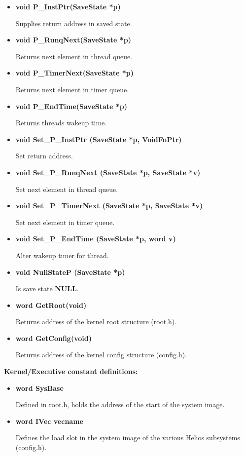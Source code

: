 \begin{itemize}

\item {\bf void P\_InstPtr(SaveState *p)} 

Supplies return address in saved state.

\item {\bf void P\_RunqNext(SaveState *p)} 

Returns next element in thread queue.

\item {\bf void P\_TimerNext(SaveState *p)} 

Returns next element in timer queue.

\item {\bf void P\_EndTime(SaveState *p)} 

Returns threads wakeup time.

\item {\bf void Set\_P\_InstPtr (SaveState *p, VoidFnPtr)} 

Set return address.

\item {\bf void Set\_P\_RunqNext (SaveState *p, SaveState *v)} 

Set next element in thread queue.

\item {\bf void Set\_P\_TimerNext (SaveState *p, SaveState *v)} 

Set next element in timer queue.

\item {\bf void Set\_P\_EndTime (SaveState *p, word v)} 

Alter wakeup timer for thread.

\item {\bf void NullStateP (SaveState *p)} 

Is save state {\bf NULL}.

\item {\bf word GetRoot(void)}

Returns address of the kernel root structure (root.h).

\item {\bf word GetConfig(void)} 

Returns address of the kernel config structure (config.h).
\end{itemize}
\vspace{0.25cm}

{\bf Kernel/Executive constant definitions:}
\vspace{0.25cm}
\begin{itemize}

\item {\bf word SysBase} 

Defined in root.h, holds the address of the start of the system image.

\item {\bf word IVec vecname} 

Defines the load slot in the system image of the various Helios 
subsystems (config.h).
\end{itemize}





